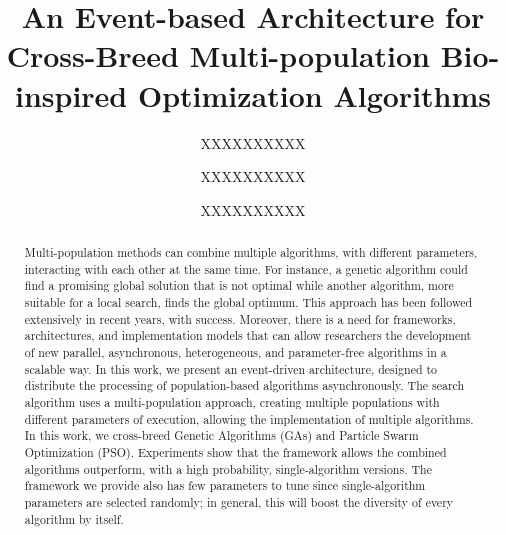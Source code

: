 \documentclass[runningheads]{llncs}
\begin{document}
%
\title{An Event-based Architecture for Cross-Breed Multi-population Bio-inspired Optimization Algorithms}
%
%
\author{XXXXXXXXXX \and
XXXXXXXXXX \and
XXXXXXXXXX}
%
%
%
\maketitle              %
%


\begin{abstract}

  Multi-population methods can combine multiple algorithms, with different
  parameters, interacting with each other at the same time. For instance, a
  genetic algorithm could find a promising global solution that is not optimal
  while another algorithm, more suitable for a local search, finds the global
  optimum. This approach has been followed extensively in recent years, with
  success. Moreover, there is a need for frameworks, architectures, and
  implementation models that can allow researchers the development of new
  parallel, asynchronous, heterogeneous, and parameter-free algorithms in a
  scalable way. In this work, we present an event-driven architecture, designed
  to distribute the processing of population-based algorithms asynchronously.
  The search algorithm uses a multi-population approach, creating multiple
  populations with different parameters of execution, allowing the
  implementation of multiple algorithms. In this work, we cross-breed Genetic
  Algorithms (GAs) and Particle Swarm Optimization (PSO). Experiments show that
  the framework allows the combined algorithms outperform, with a high
  probability, single-algorithm versions. The framework we provide also has few
  parameters to tune since single-algorithm parameters are selected randomly; in
  general, this will boost the diversity of every algorithm by itself.


\end{abstract}
%
%
%
\end{document}
